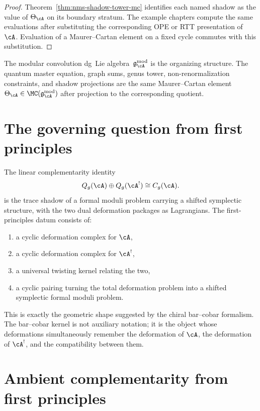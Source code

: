 \begin{proof}
Theorem~\ref{thm:nms-shadow-tower-mc} identifies each named
shadow as the value of $\Theta_\cA$ on its boundary stratum. The
example chapters compute the same evaluations after substituting the
corresponding OPE or RTT presentation of~$\cA$. Evaluation of a
Maurer--Cartan element on a fixed cycle commutes with this substitution.
\end{proof}

\begin{remark}
\label{rem:nms-chriss-ginzburg}%
The modular convolution dg~Lie algebra~$\gAmod$ is the organizing
structure. The quantum master equation, graph sums, genus tower,
non-renormalization constraints, and shadow projections are the same
Maurer--Cartan element $\Theta_{\cA}\in\MC(\gAmod)$ after projection to
the corresponding quotient.
\end{remark}

\section{The governing question from first principles}
\label{sec:nms-governing-question}

The linear complementarity identity
\[
Q_g(\cA)\oplus Q_g(\cA^!) \cong C_g(\cA).
\]
is the trace shadow of a formal moduli problem carrying a shifted
symplectic structure, with the two dual deformation packages as
Lagrangians. The first-principles datum consists of:
\begin{enumerate}[label=\textup{(\arabic*)}]
\item a cyclic deformation complex for $\cA$,
\item a cyclic deformation complex for $\cA^!$,
\item a universal twisting kernel relating the two,
\item a cyclic pairing turning the total deformation problem into a shifted symplectic formal moduli problem.
\end{enumerate}

This is exactly the geometric shape suggested by the chiral bar--cobar formalism. The bar--cobar kernel is not auxiliary notation; it is the object whose deformations simultaneously remember the deformation of $\cA$, the deformation of $\cA^!$, and the compatibility between them.

\section{Ambient complementarity from first principles}
\label{sec:nms-ambient-complementarity}

